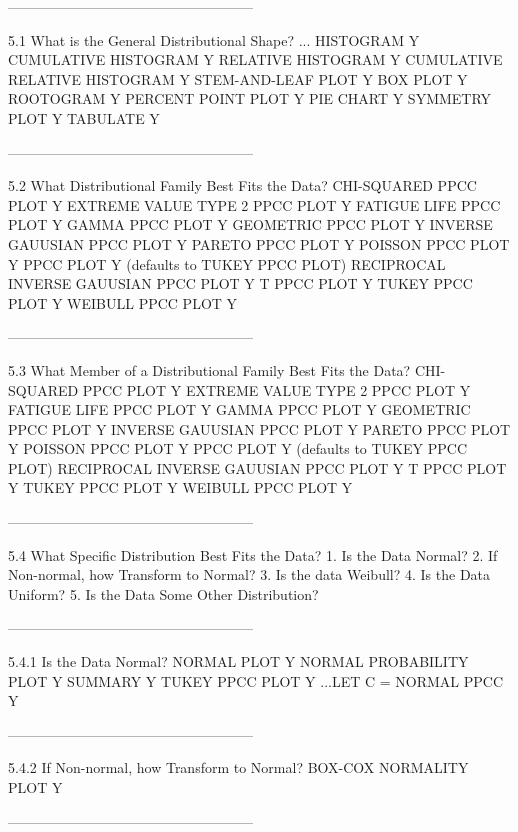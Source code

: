 -----------------------------------------------------
 
5.1
What is the General Distributional Shape?
      ... HISTOGRAM Y
         CUMULATIVE HISTOGRAM Y
         RELATIVE HISTOGRAM Y
         CUMULATIVE RELATIVE HISTOGRAM Y
      STEM-AND-LEAF PLOT Y
      BOX PLOT Y
      ROOTOGRAM Y
      PERCENT POINT PLOT Y
      PIE CHART Y
      SYMMETRY PLOT Y
      TABULATE Y
 
-----------------------------------------------------
 
5.2
What Distributional Family Best Fits the Data?
      CHI-SQUARED PPCC PLOT Y
      EXTREME VALUE TYPE 2 PPCC PLOT Y
      FATIGUE LIFE PPCC PLOT Y
      GAMMA PPCC PLOT Y
      GEOMETRIC PPCC PLOT Y
      INVERSE GAUUSIAN PPCC PLOT Y
      PARETO PPCC PLOT Y
      POISSON PPCC PLOT Y
      PPCC PLOT Y    (defaults to TUKEY PPCC PLOT)
      RECIPROCAL INVERSE GAUUSIAN PPCC PLOT Y
      T PPCC PLOT Y
      TUKEY PPCC PLOT Y
      WEIBULL PPCC PLOT Y
 
-----------------------------------------------------
 
5.3
What Member of a Distributional Family Best Fits the Data?
      CHI-SQUARED PPCC PLOT Y
      EXTREME VALUE TYPE 2 PPCC PLOT Y
      FATIGUE LIFE PPCC PLOT Y
      GAMMA PPCC PLOT Y
      GEOMETRIC PPCC PLOT Y
      INVERSE GAUUSIAN PPCC PLOT Y
      PARETO PPCC PLOT Y
      POISSON PPCC PLOT Y
      PPCC PLOT Y    (defaults to TUKEY PPCC PLOT)
      RECIPROCAL INVERSE GAUUSIAN PPCC PLOT Y
      T PPCC PLOT Y
      TUKEY PPCC PLOT Y
      WEIBULL PPCC PLOT Y
 
-----------------------------------------------------
 
5.4
What Specific Distribution Best Fits the Data?
   1.  Is the Data Normal?
   2.  If Non-normal, how Transform to Normal?
   3.  Is the data Weibull?
   4.  Is the Data Uniform?
   5.  Is the Data Some Other Distribution?
 
-----------------------------------------------------
 
5.4.1
Is the Data Normal?
      NORMAL PLOT Y
      NORMAL PROBABILITY PLOT Y
      SUMMARY Y
      TUKEY PPCC PLOT Y
      ...LET C = NORMAL PPCC Y
 
-----------------------------------------------------
 
5.4.2
If Non-normal, how Transform to Normal?
      BOX-COX NORMALITY PLOT Y
 
-----------------------------------------------------
 
